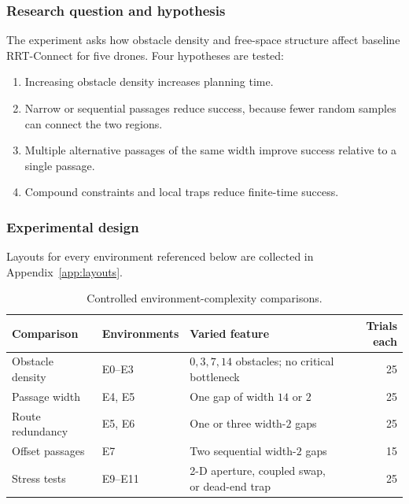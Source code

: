 \documentclass[11pt,a4paper]{article}
\begin{document}
\subsubsection*{Research question and hypothesis}
The experiment asks how obstacle density and free-space structure affect
baseline RRT-Connect for five drones. Four hypotheses are tested:
\begin{enumerate}[label=(\arabic*),nosep]
  \item Increasing obstacle density increases planning time.
  \item Narrow or sequential passages reduce success, because fewer random
        samples can connect the two regions.
  \item Multiple alternative passages of the same width improve success
        relative to a single passage.
  \item Compound constraints and local traps reduce finite-time success.
\end{enumerate}

\subsubsection*{Experimental design}
Layouts for every environment referenced below are collected in
Appendix~\ref{app:layouts}.
\begin{table}[H]
  \centering
  \caption{Controlled environment-complexity comparisons.}
  \label{tab:experiment-design}
  \begin{tabularx}{\textwidth}{@{}p{}p{}Xr@{}}
    \toprule
    Comparison & Environments & Varied feature & Trials each \\
    \midrule
    Obstacle density & E0--E3 & $0,3,7,14$ obstacles; no critical bottleneck & 25 \\
    Passage width & E4, E5 & One gap of width $14$ or $2$ & 25 \\
    Route redundancy & E5, E6 & One or three width-$2$ gaps & 25 \\
    Offset passages & E7 & Two sequential width-$2$ gaps & 15 \\
    Stress tests & E9--E11 & 2-D aperture, coupled swap, or dead-end trap & 25 \\
    \bottomrule
  \end{tabularx}
\end{table}
\end{document}
